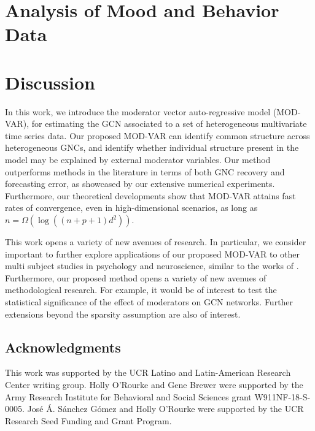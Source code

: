 	

\section{Analysis of Mood and Behavior Data}\label{section:realData}





\section{Discussion}\label{section:discussion}

In this work, we introduce the moderator vector auto-regressive model (MOD-VAR), for estimating the GCN associated to a set of heterogeneous multivariate time series data. Our proposed MOD-VAR can identify common structure across heterogeneous GNCs, and identify whether individual structure present in the model may be explained by external moderator variables. Our method outperforms methods in the literature in terms of both GNC recovery and forecasting error, as showcased by our extensive numerical experiments. Furthermore, our theoretical developments show that MOD-VAR attains fast rates of convergence, even in high-dimensional scenarios, as long as  $n = \Omega(\log((n+p+1) d^2))$. 

This work opens a variety of new avenues of research. In particular, we consider important to further explore applications of our proposed MOD-VAR to other multi subject studies in psychology and neuroscience, similar to the works of \citep{kim2007unified,rogers2007assessing,deshpande2009multivariate}. Furthermore, our proposed method opens a variety of new avenues of methodological research. For example, it would be of interest to test the statistical significance of the effect of moderators on GCN networks. Further extensions beyond the sparsity assumption are also of interest.


\vspace{-3mm}
\subsection*{Acknowledgments}
\vspace{-3mm}

This work was supported by the UCR Latino and Latin-American Research Center writing group. Holly O'Rourke and Gene Brewer were supported by the Army Research Institute for Behavioral and Social Sciences grant W911NF-18-S-0005. José Á. Sánchez Gómez and Holly O'Rourke were supported by the UCR Research Seed Funding and Grant Program.

